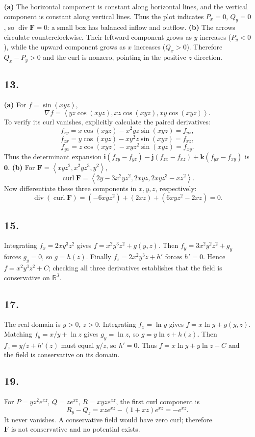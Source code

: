 \documentclass[11pt]{article}
\newcommand{\ex}[1]{\subsection*{#1.}}
\newcommand{\ans}[1]{\boxed{#1}}
\newcommand{\vv}[1]{\left\langle #1\right\rangle}
\newcommand{\ii}{\mathbf i}\newcommand{\jj}{\mathbf j}\newcommand{\kk}{\mathbf k}
\begin{document}
\textbf{(a)} The horizontal component is constant along horizontal lines, and the vertical component is constant along vertical lines. Thus the plot indicates $P_x=0$, $Q_y=0$, so $\ans{\operatorname{div}\mathbf F=0}$: a small box has balanced inflow and outflow.
\textbf{(b)} The arrows circulate counterclockwise. Their leftward component grows as $y$ increases ($P_y<0$), while the upward component grows as $x$ increases ($Q_x>0$). Therefore $Q_x-P_y>0$ and the curl is nonzero, pointing $\ans{\text{in the positive }z\text{ direction}}$.
\ex{13}
\textbf{(a)} For $f=\sin(xyz)$,
\[\nabla f=\vv{yz\cos(xyz),xz\cos(xyz),xy\cos(xyz)}.\]
To verify its curl vanishes, explicitly calculate the paired derivatives:
\[f_{zy}=x\cos(xyz)-x^2yz\sin(xyz)=f_{yz},\]
\[f_{zx}=y\cos(xyz)-xy^2z\sin(xyz)=f_{xz},\]
\[f_{yx}=z\cos(xyz)-xyz^2\sin(xyz)=f_{xy}.\]
Thus the determinant expansion $\ii(f_{zy}-f_{yz})-\jj(f_{zx}-f_{xz})+\kk(f_{yx}-f_{xy})$ is $\ans{\mathbf0}$.
\textbf{(b)} For $\mathbf F=\vv{xyz^2,x^2yz^3,y^2}$,
\[\operatorname{curl}\mathbf F=\vv{2y-3x^2yz^2,2xyz,2xyz^3-xz^2}.\]
Now differentiate these three components in $x,y,z$, respectively:
\[\operatorname{div}(\operatorname{curl}\mathbf F)
=(-6xyz^2)+(2xz)+(6xyz^2-2xz)=\ans{0}.\]
\ex{15}
Integrating $f_x=2xy^3z^2$ gives $f=x^2y^3z^2+g(y,z)$. Then $f_y=3x^2y^2z^2+g_y$ forces $g_y=0$, so $g=h(z)$. Finally $f_z=2x^2y^3z+h'$ forces $h'=0$. Hence $\ans{f=x^2y^3z^2+C}$; checking all three derivatives establishes that the field is conservative on $\mathbb R^3$.
\ex{17}
The real domain is $y>0$, $z>0$. Integrating $f_x=\ln y$ gives $f=x\ln y+g(y,z)$. Matching $f_y=x/y+\ln z$ gives $g_y=\ln z$, so $g=y\ln z+h(z)$. Then $f_z=y/z+h'(z)$ must equal $y/z$, so $h'=0$. Thus $\ans{f=x\ln y+y\ln z+C}$ and the field is conservative on its domain.
\ex{19}
For $P=yz^2e^{xz}$, $Q=ze^{xz}$, $R=xyze^{xz}$, the first curl component is
\[R_y-Q_z=xze^{xz}-(1+xz)e^{xz}=-e^{xz}.\]
It never vanishes. A conservative field would have zero curl; therefore $\ans{\mathbf F\text{ is not conservative}}$ and no potential exists.
\end{document}

